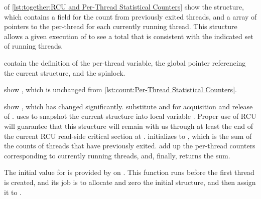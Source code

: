 \begin{fcvref}
 of
\cref{lst:together:RCU and Per-Thread Statistical Counters}
show the  structure, which contains a
 field for the count from previously exited threads,
and a  array of pointers to the per-thread
 for each currently running thread.
This structure allows a given execution of 
to see a total that is consistent with the indicated set of running
threads.

\begin{listing}
\caption{RCU and Per-Thread Statistical Counters}
\label{lst:together:RCU and Per-Thread Statistical Counters}
\end{listing}

contain the definition of the per-thread 
variable, the global pointer  referencing
the current  structure, and
the  spinlock.

 show , which is unchanged from
\cref{lst:count:Per-Thread Statistical Counters}.
\end{fcvref}

\begin{fcvref}
 show , which has changed significantly.
 substitute  and
 for acquisition and release of .
 uses  to snapshot the
current  structure into local variable .
Proper use of RCU will guarantee that this  structure
will remain with us through at least the end of the current RCU
read-side critical section at .
 initializes  to , which is the
sum of the counts of threads that have previously exited.
 add up the per-thread counters corresponding
to currently
running threads, and, finally,  returns the sum.
\end{fcvref}

\begin{fcvref}
The initial value for  is
provided by  on .
This function runs before the first thread is created, and its job
is to allocate
and zero the initial structure, and then assign it to .
\end{fcvref}

